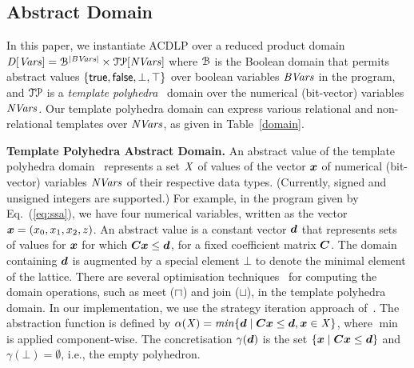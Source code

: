 \subsection{Abstract Domain}
In this paper, we instantiate ACDLP over a reduced product domain~\cite{CC79}
$\mathit{D}[\mathit{Vars}]=\mathcal{B}^{|\mathit{BVars}|}\times\mathcal{TP}[\mathit{NVars}]$ where
$\mathcal{B}$ is the Boolean domain that permits abstract values
$\{\mathsf{true},\mathsf{false},\bot,\top\}$ over boolean variables $\mathit{BVars}$ in the
program, and $\mathcal{TP}$ is a \textit{template polyhedra}~\cite{vmcai05}
domain over the numerical (bit-vector) variables $\mathit{NVars}$.  Our template
polyhedra domain can express various relational and non-relational templates
over $\mathit{NVars}$, as given in Table~\ref{domain}.

\bigskip

\noindent\textbf{Template Polyhedra Abstract Domain.}
An abstract value of the template polyhedra domain~\cite{vmcai05}
represents a set $\mathit{X}$ of values of the vector ${\boldsymbol {x}}$ 
of numerical (bit-vector) variables $\mathit{NVars}$ of their respective
data types. (Currently, signed and unsigned integers are supported.)
For example, in the program given by Eq.~(\ref{eq:ssa}), we have four 
numerical variables, written as the vector ${\boldsymbol {x}} = (x_0,x_1,x_2,z)$.  
An abstract value is a constant vector ${\boldsymbol {d}}$ that represents 
sets of values for ${\boldsymbol {x}}$ for which 
${\boldsymbol C}{\boldsymbol {x}}\leq{\boldsymbol {d}}$, for a fixed coefficient 
matrix ${\boldsymbol C}$.  The domain containing ${\boldsymbol {d}}$ is augmented 
by a special element $\bot$ to denote the minimal element of the lattice.  
%
There are several optimisation techniques~\cite{vmcai05} for computing the domain operations, 
such as meet ($\sqcap$) and join ($\sqcup$), in the template polyhedra domain.  
In our implementation, we use the strategy iteration approach of~\cite{BJKS15}.
%
The abstraction function is defined by $\alpha(\mathit{X}) = \mathit{min} \{{\boldsymbol {d}}\mid
{\boldsymbol C}{\boldsymbol {x}}\leq{\boldsymbol {d}}, {\boldsymbol {x}}\in \mathit{X}\}$, where 
$\min$ is applied component-wise.  The concretisation $\gamma({\boldsymbol {d}})$ is the set $\{{\boldsymbol {x}}\mid
{\boldsymbol C}{\boldsymbol {x}}\leq{\boldsymbol {d}}\}$ and $\gamma(\bot)=\emptyset$,
i.e., the empty polyhedron.

